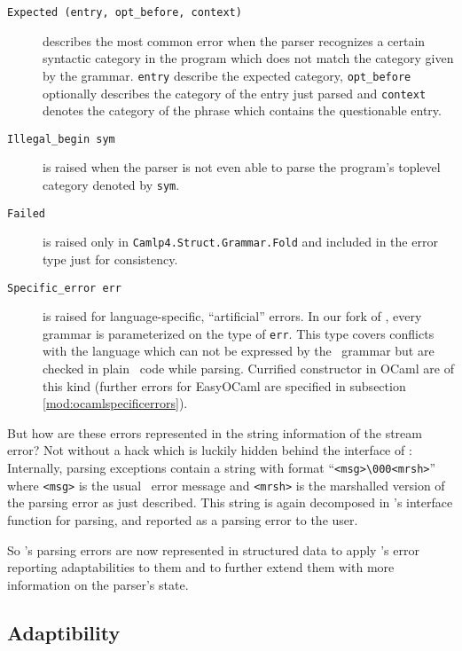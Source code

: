 \begin{description}
    \item[\texttt{Expected~(entry,~opt\_before,~context)}] describes the most
      common error when the parser recognizes a certain syntactic category in
      the program which does not match the category given by the grammar.
      \texttt{entry} describe the expected category, \texttt{opt\_before}
      optionally describes the category of the entry just parsed and
      \texttt{context} denotes the category of the phrase which contains the
      questionable entry.
    \item[\texttt{Illegal\_begin~sym}] is raised when the parser is 
      not even able to parse the program's toplevel category denoted by
      \texttt{sym}.
    \item[\texttt{Failed}] is raised only in 
      \texttt{Camlp4.Struct.Grammar.Fold} and included in the error type just
      for consistency.
    \item[\texttt{Specific\_error~err}] is raised for language-specific,
      ``artificial'' errors.  In our fork of \camlpf, every grammar is
      parameterized on the type of \texttt{err}. This type covers conflicts with
      the language which can not be expressed by the \camlpf\ grammar but are
      checked in plain \ocaml\ code while parsing. Currified constructor in
      OCaml are of this kind (further errors for EasyOCaml are specified in
      subsection
      \ref{mod:ocamlspecificerrors}).
\end{description}

But how are these errors represented in the string information of the stream
error? 
Not without a hack which is luckily hidden behind the interface of \camlpf:
Internally, parsing exceptions contain a string with format
``\texttt{<msg>\textbackslash 000<mrsh>}'' where \texttt{<msg>} is
the usual \camlpf\ error message and \texttt{<mrsh>} is the marshalled version
of the parsing error as just described.
This string is again decomposed in \camlpf's interface function for
parsing, and
reported as a parsing error to the user.

So \camlpf's parsing errors are now represented in structured data to
apply \easyocaml's error reporting adaptabilities to them and to further extend
them with more information on the parser's state.

\subsection{Adaptibility}

